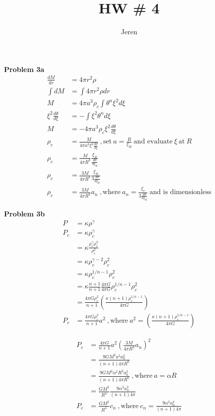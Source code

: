 \documentclass[10pt,a4paper]{article}
\author{Jeren}
\title{HW \# 4}
\begin{document}
\large{\textbf{Problem 3a}}
\begin{align*}
\frac{dM}{dr} & = 4\pi r^2 \rho\\
\int dM & = \int 4 \pi r^2 \rho dr \\
M & = 4 \pi a^3 \rho_c \int \theta^n \xi^2 d \xi \\
\xi^2 \frac{d\theta}{d \xi} & = - \int \xi^2 \theta^n d\xi\\
M & = -4 \pi a^3 \rho_c \xi^2 \frac{d \theta}{d \xi}\\
\rho_c & = \frac{M}{4 \pi a^3 \xi^2 \frac{d \theta}{d \xi}}~, \text{set} ~ a=\frac{R}{\xi_R}~ \text{and evaluate}~ \xi ~\text{at} ~ R\\
\rho_c & = \frac{M}{4 \pi R^3 } \frac{\xi_R}{\frac{d \theta}{d \xi_R}}\\
\rho_c & = \frac{3M}{4 \pi R^3 } \frac{\xi_R}{3 \frac{d \theta}{d \xi_R}}\\
\rho_c & = \frac{3M}{4 \pi R^3 }a_n ~, \text{where} ~a_n = \frac{\xi_r}{3 \frac{d \theta}{d \xi_R}}~ \text{and is dimensionless}
\end{align*}

\large{\textbf{Problem 3b}}
\begin{align*}
P & =\kappa \rho ^\gamma\\
P_c &  = \kappa \rho_c^\gamma\\
& = \kappa \frac{\rho_c^\gamma \rho_c^2}{\rho_c^2}\\
& = \kappa \rho_c ^{\gamma -2}\rho_c^2\\
& = \kappa \rho_c ^{1/n -1}\rho_c^2\\
& = \kappa \frac{n+1}{n+1} \frac{4 \pi G}{4 \pi G} \rho_c^{1/n -1} \rho_c^2\\
& = \frac{4 \pi G \rho_c^2}{n+1} \left(  \frac{\kappa(n+1)\rho_c^{1/n -1}}{4 \pi G} \right)\\
P_c & = \frac{4 \pi G \rho_c^2}{n+1}a^2 ~,\text{where}~ a^2 = \left(  \frac{\kappa(n+1)\rho_c^{1/n -1}}{4 \pi G} \right)
\end{align*}

\begin{align*}
P_c & = \frac{4 \pi G}{n+1}a^2 \left( \frac{3M}{4 \pi R^3} a_n\right)^2\\
& = \frac{9 G M^2 a^2 a_n^2}{(n+1)4\pi R^6}\\
& = \frac{9GM^2 \alpha^2 R^2 a_n^2}{(n+1)4\pi R^6}~, \text{where}~ a=\alpha R\\
& = \frac{GM^2}{R^4}\frac{9 \alpha^2 a_n^2}{(n+1)4 \pi}\\
P_c & = \frac{GM^2}{R^4}c_n~, \text{where} ~c_n=\frac{9 \alpha^2 a_n^2}{(n+1)4 \pi}
\end{align*}
\end{document}
